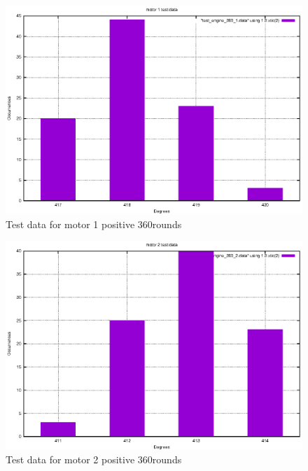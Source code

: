 \begin{figure}[ht]
  \includegraphics{graphics/test_graphs/test_engine_360_1.eps}
  \caption{Test data for motor 1 positive 360\textdegree rounds}
  \centering
  \label{fig:td_m1}
\end{figure}

\begin{figure}[ht]
  \includegraphics{graphics/test_graphs/test_engine_360_2.eps}
  \caption{Test data for motor 2 positive 360\textdegree rounds}
  \centering
  \label{fig:td_m2}
\end{figure}

